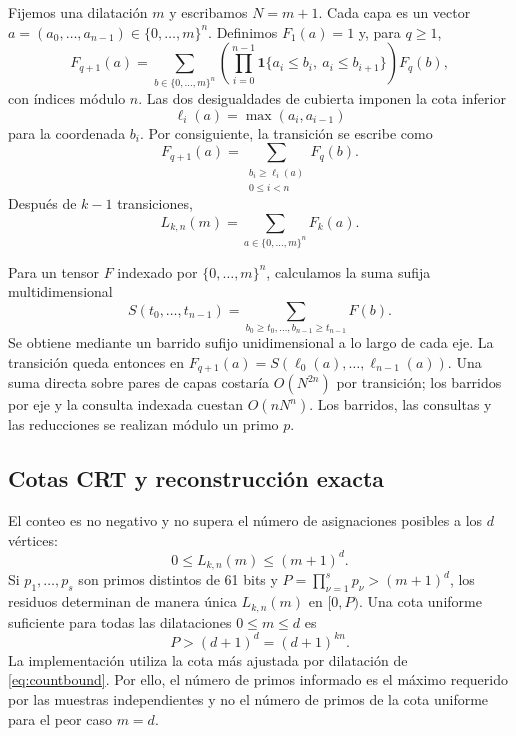 \documentclass[11pt,a4paper]{article}
\begin{document}
Fijemos una dilatación $m$ y escribamos $N=m+1$. Cada capa es un vector
$a=(a_0,\ldots,a_{n-1})\in\{0,\ldots,m\}^n$. Definimos $F_1(a)=1$ y, para
$q\geq1$,
\begin{equation}
  F_{q+1}(a)=
  \sum_{b\in\{0,\ldots,m\}^n}
  \left(\prod_{i=0}^{n-1}
  \mathbf{1}\{a_i\leq b_i,\ a_i\leq b_{i+1}\}\right)F_q(b),
  \label{eq:transfer}
\end{equation}
con índices módulo $n$. Las dos desigualdades de cubierta imponen la cota
inferior
\[
  \ell_i(a)=\max(a_i,a_{i-1})
\]
para la coordenada $b_i$. Por consiguiente, la transición se escribe como
\begin{equation}
  F_{q+1}(a)=
  \sum_{\substack{b_i\geq\ell_i(a)\\0\leq i<n}}F_q(b).
  \label{eq:orthant}
\end{equation}
Después de $k-1$ transiciones,
\[
  L_{k,n}(m)=\sum_{a\in\{0,\ldots,m\}^n}F_k(a).
\]

Para un tensor $F$ indexado por $\{0,\ldots,m\}^n$, calculamos la suma
sufija multidimensional
\[
  S(t_0,\ldots,t_{n-1})
  =\sum_{b_0\geq t_0,\ldots,b_{n-1}\geq t_{n-1}}F(b).
\]
Se obtiene mediante un barrido sufijo unidimensional a lo largo de cada
eje. La transición queda entonces en
$F_{q+1}(a)=S(\ell_0(a),\ldots,\ell_{n-1}(a))$. Una suma directa sobre
pares de capas costaría $O(N^{2n})$ por transición; los barridos por eje y
la consulta indexada cuestan $O(nN^n)$. Los barridos, las consultas y las
reducciones se realizan módulo un primo $p$.

\subsection{Cotas CRT y reconstrucción exacta}

El conteo es no negativo y no supera el número de asignaciones posibles a
los $d$ vértices:
\begin{equation}
  0\leq L_{k,n}(m)\leq(m+1)^d.
  \label{eq:countbound}
\end{equation}
Si $p_1,\ldots,p_s$ son primos distintos de 61 bits y
$P=\prod_{\nu=1}^s p_\nu>(m+1)^d$, los residuos determinan de manera única
$L_{k,n}(m)$ en $[0,P)$. Una cota uniforme suficiente para todas las
dilataciones $0\leq m\leq d$ es
\[
  P>(d+1)^d=(d+1)^{kn}.
\]
La implementación utiliza la cota más ajustada por dilatación de
\eqref{eq:countbound}. Por ello, el número de primos informado es el máximo
requerido por las muestras independientes y no el número de primos de la
cota uniforme para el peor caso $m=d$.
\end{document}

